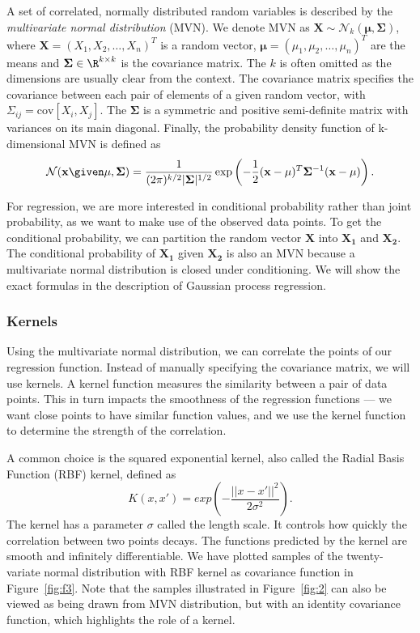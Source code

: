 A set of correlated, normally distributed random variables is described by the \textit{multivariate normal distribution} (MVN). We denote MVN as $\mathbf{X} \sim \mathcal{N}_k(\mathbf{\mu}, \mathbf{\Sigma})$, where $\mathbf{X}=(X_1,X_2,\ldots ,X_n)^T$ is a random vector, $\mathbf{\mu}= (\mu_1,\mu_2,\ldots , \mu_n)^T$ are the means and $\mathbf{\Sigma} \in  \R^{k \times k}$ is the covariance matrix. The $k$ is often omitted as the dimensions are usually clear from the context. The covariance matrix specifies the covariance between each pair of elements of a given random vector, with $\Sigma_{ij} = \text{cov}[X_i, X_j]$. The $\mathbf{\Sigma}$ is a symmetric and positive semi-definite matrix with variances on its main diagonal. Finally, the probability density function of k-dimensional MVN is defined as \[ \mathcal{N}(\mathbf{x} \given \mathbf{\mu}, \mathbf{\Sigma}) = \frac{1}{(2\pi)^{k/2} |\mathbf{\Sigma}|^{1/2}} \exp \left(-\frac{1}{2} (\mathbf{x} - \mathbf{\mu})^T \mathbf{\Sigma}^{-1} (\mathbf{x} - \mathbf{\mu}) \right). \]


For regression, we are more interested in conditional probability rather than joint probability, as we want to make use of the observed data points. To get the conditional probability, we can partition the random vector $\mathbf{X}$ into $\mathbf{X_1}$ and $\mathbf{X_2}$. The conditional probability of $\mathbf{X_1}$ given $\mathbf{X_2}$ is also an MVN because a multivariate normal distribution is closed under conditioning. We will show the exact formulas in the description of Gaussian process regression.

%
\subsubsection{Kernels}
Using the multivariate normal distribution, we can correlate the points of our regression function. Instead of manually specifying the covariance matrix, we will use kernels. A kernel function measures the similarity between a pair of data points. This in turn impacts the smoothness of the regression functions --- we want close points to have similar function values, and we use the kernel function to determine the strength of the correlation.

A common choice is the squared exponential kernel, also called the Radial Basis Function (RBF) kernel, defined as \[ K(x, x') = exp \left( -  \frac{||x - x'||^2} {2 \sigma^2}\right). \] The kernel has a parameter $\sigma$ called the length scale. It controls how quickly the correlation between two points decays. The functions predicted by the kernel are smooth and infinitely differentiable. We have plotted samples of the twenty-variate normal distribution with RBF kernel as covariance function in Figure~\ref{fig:f3}. Note that the samples illustrated in Figure~\ref{fig:2} can also be viewed as being drawn from MVN distribution, but with an identity covariance function, which highlights the role of a kernel.

